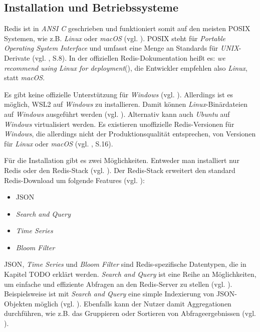 
\subsection{Installation und Betriebssysteme}

\acs{Redis} ist in \textit{ANSI C} geschrieben und funktioniert somit auf den meisten \acs{POSIX} Systemen, wie z.B. \textit{Linux} oder \textit{macOS} (vgl. \cite{Redis-Docs-Intro}). \acs{POSIX} steht für \textit{Portable Operating System Interface} und umfasst eine Menge an Standards für \textit{UNIX}-Derivate (vgl. \cite{15}, S.8). In der offiziellen \ac{Redis}-Dokumentation heißt es: \glqq \textit{we recommend using Linux for deployment}\grqq (\cite{Redis-Docs-Intro}), die Entwickler empfehlen also \textit{Linux}, statt \textit{macOS}.

Es gibt keine offizielle Unterstützung für \textit{Windows} (vgl. \cite{Redis-Docs-Intro}). Allerdings ist es möglich, \ac{WSL2} auf \textit{Windows} zu installieren. Damit können \textit{Linux}-Binärdateien auf \textit{Windows} ausgeführt werden (vgl. \cite{Redis-Docs-Install-W}). Alternativ kann auch \textit{Ubuntu} auf \textit{Windows} virtualisiert werden. Es existieren unoffizielle \ac{Redis}-Versionen für \textit{Windows}, die allerdings nicht der Produktionsqualität entsprechen, von Versionen für \textit{Linux} oder \textit{macOS} (vgl. \cite{4}, S.16). 

Für die Installation gibt es zwei Möglichkeiten. Entweder man installiert nur \ac{Redis} oder den \ac{Redis}-Stack (vgl. \cite{Redis-Docs-Install-R-or-RS}). Der \ac{Redis}-Stack erweitert den standard \ac{Redis}-Download um folgende Features (vgl. \cite{Redis-Docs-Redis-Stack}):

\begin{itemize}
	\item \ac{JSON}
	\item \textit{Search and Query}
	\item \textit{Time Series}
	\item \textit{Bloom Filter}
\end{itemize}

\ac{JSON}, \textit{Time Series} und \textit{Bloom Filter} sind \ac{Redis}-spezifische Datentypen, die in Kapitel TODO erklärt werden. \textit{Search and Query} ist eine Reihe an Möglichkeiten, um einfache und effiziente Abfragen an den \ac{Redis}-Server zu stellen (vgl. \cite{Redis-Docs-Search-Query}). Beispielsweise ist mit \textit{Search and Query} eine simple Indexierung von \ac{JSON}-Objekten möglich (vgl. \cite{Redis-Docs-Search-Query}). Ebenfalls kann der Nutzer damit Aggregationen durchführen, wie z.B. das Gruppieren oder Sortieren von Abfrageergebnissen (vgl. \cite{Redis-Docs-Aggregation}).  

